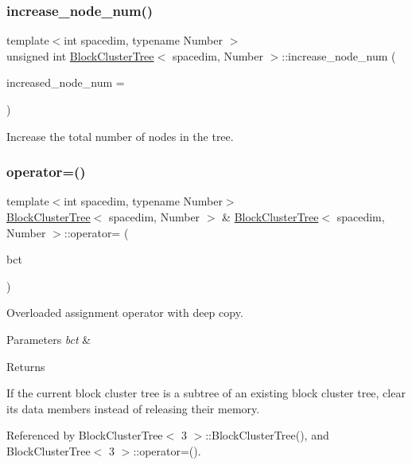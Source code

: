 \subsubsection{\texorpdfstring{increase\+\_\+node\+\_\+num()}{increase\_node\_num()}}
{\footnotesize\ttfamily template$<$int spacedim, typename Number $>$ \\
unsigned int \hyperlink{classBlockClusterTree}{Block\+Cluster\+Tree}$<$ spacedim, Number $>$\+::increase\+\_\+node\+\_\+num (\begin{DoxyParamCaption}\item[{unsigned int}]{increased\+\_\+node\+\_\+num = {} }\end{DoxyParamCaption})}

Increase the total number of nodes in the tree. \mbox{\label{classBlockClusterTree_a85553cc442e419b8d707720312118328}} 
\subsubsection{\texorpdfstring{operator=()}{operator=()}\hspace{0.1cm}{\footnotesize\ttfamily [1/2]}}
{\footnotesize\ttfamily template$<$int spacedim, typename Number$>$ \\
\hyperlink{classBlockClusterTree}{Block\+Cluster\+Tree}$<$ spacedim, Number $>$ \& \hyperlink{classBlockClusterTree}{Block\+Cluster\+Tree}$<$ spacedim, Number $>$\+::operator= (\begin{DoxyParamCaption}\item[{const \hyperlink{classBlockClusterTree}{Block\+Cluster\+Tree}$<$ spacedim, Number $>$ \&}]{bct }\end{DoxyParamCaption})}

Overloaded assignment operator with deep copy. 
\begin{DoxyParams}{Parameters}
{\em bct} & \\
\hline
\end{DoxyParams}
\begin{DoxyReturn}{Returns}

\end{DoxyReturn}
If the current block cluster tree is a subtree of an existing block cluster tree, clear its data members instead of releasing their memory.

Referenced by Block\+Cluster\+Tree$<$ 3 $>$\+::\+Block\+Cluster\+Tree(), and Block\+Cluster\+Tree$<$ 3 $>$\+::operator=().

